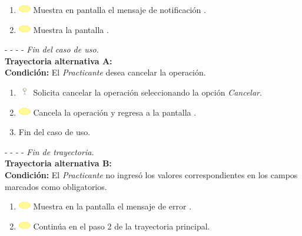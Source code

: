 \begin{enumerate}
	\item \includegraphics[width=15pt]{./Figuras/iconosCU/herramienta.png} Muestra en pantalla el mensaje de notificación .
	\item \includegraphics[width=15pt]{./Figuras/iconosCU/herramienta.png} Muestra la pantalla .
\end{enumerate}
	
- - - - \textit{Fin del caso de uso.} \\

\textbf{\large{Trayectoria alternativa A:}} \\
\textbf{Condición: } El \textit{Practicante} desea cancelar la operación.

\begin{enumerate}
	\item \includegraphics[width=15pt, height=10pt]{./Figuras/iconosCU/usuario.png} Solicita cancelar la operación seleccionando la opción \textit{Cancelar}.
	\item \includegraphics[width=15pt]{./Figuras/iconosCU/herramienta.png} Cancela la operación y regresa a la pantalla .
	\item Fin del caso de uso.
\end{enumerate}
	

- - - - \textit{Fin de trayectoria.} \\

\textbf{\large{Trayectoria alternativa B:}} \\
\textbf{Condición: } El \textit{Practicante} no ingresó los valores correspondientes en los campos marcados como obligatorios.

\begin{enumerate}
	\item \includegraphics[width=15pt]{./Figuras/iconosCU/herramienta.png} Muestra en la pantalla  el mensaje de error .
	\item \includegraphics[width=15pt]{./Figuras/iconosCU/herramienta.png} Continúa en el paso 2 de la trayectoria principal.
\end{enumerate}

